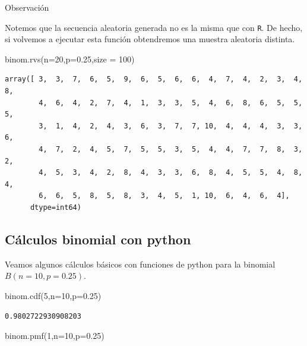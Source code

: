 \documentclass[
  letterpaper,
  DIV=11,
  numbers=noendperiod]{scrreprt}
\newenvironment{Shaded}{\begin{snugshade}}{\end{snugshade}}
\newcommand{\DecValTok}[1]{\textcolor[rgb]{0.68,0.00,0.00}{#1}}
\newcommand{\FloatTok}[1]{\textcolor[rgb]{0.68,0.00,0.00}{#1}}
\newcommand{\NormalTok}[1]{\textcolor[rgb]{0.00,0.23,0.31}{#1}}
\newcommand{\OperatorTok}[1]{\textcolor[rgb]{0.37,0.37,0.37}{#1}}
\begin{document}
Observación

Notemos que la secuencia aleatoria generada no es la misma que con
\texttt{R}. De hecho, si volvemos a ejecutar esta función obtendremos
una muestra aleatoria distinta.

\begin{Shaded}
\begin{Highlighting}[]
\NormalTok{binom.rvs(n}\OperatorTok{=}\DecValTok{20}\NormalTok{,p}\OperatorTok{=}\FloatTok{0.25}\NormalTok{,size }\OperatorTok{=} \DecValTok{100}\NormalTok{)}
\end{Highlighting}
\end{Shaded}

\begin{verbatim}
array([ 3,  3,  7,  6,  5,  9,  6,  5,  6,  6,  4,  7,  4,  2,  3,  4,  8,
        4,  6,  4,  2,  7,  4,  1,  3,  3,  5,  4,  6,  8,  6,  5,  5,  5,
        3,  1,  4,  2,  4,  3,  6,  3,  7,  7, 10,  4,  4,  4,  3,  3,  6,
        4,  7,  2,  4,  5,  7,  5,  5,  3,  5,  4,  4,  7,  7,  8,  3,  2,
        4,  5,  3,  4,  2,  8,  4,  3,  3,  6,  8,  4,  5,  5,  4,  8,  4,
        6,  6,  5,  8,  5,  8,  3,  4,  5,  1, 10,  6,  4,  6,  4],
      dtype=int64)
\end{verbatim}

\subsection{Cálculos binomial con
python}\label{cuxe1lculos-binomial-con-python}

Veamos algunos cálculos básicos con funciones de python para la binomial
\(B(n=10,p=0.25)\).

\begin{Shaded}
\begin{Highlighting}[]
\NormalTok{binom.cdf(}\DecValTok{5}\NormalTok{,n}\OperatorTok{=}\DecValTok{10}\NormalTok{,p}\OperatorTok{=}\FloatTok{0.25}\NormalTok{)}
\end{Highlighting}
\end{Shaded}

\begin{verbatim}
0.9802722930908203
\end{verbatim}

\begin{Shaded}
\begin{Highlighting}[]
\NormalTok{binom.pmf(}\DecValTok{1}\NormalTok{,n}\OperatorTok{=}\DecValTok{10}\NormalTok{,p}\OperatorTok{=}\FloatTok{0.25}\NormalTok{)}
\end{Highlighting}
\end{Shaded}
\end{document}
